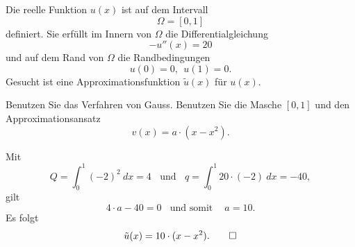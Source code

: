 Die reelle Funktion $u(x)$ ist auf dem Intervall $$\Omega = [0, 1]$$
definiert. Sie erfüllt im Innern von $\Omega$ die Differentialgleichung
\[
- u''(x) = 20
\]
und auf dem Rand von $\Omega$ die Randbedingungen 
\[
u(0) = 0, \ \ u(1) = 0.
\]
Gesucht ist eine Approximationsfunktion $\tilde u(x)$ für $u(x)$.

Benutzen Sie das Verfahren von Gauss. Benutzen Sie die Masche $[0,1]$
und den Approximationsansatz
\[
v(x) = a \cdot (x - x^2).
\]

\begin{loesung}
Mit
\[
Q = \int_0^1 (-2)^2 \ dx = 4 \ \ \ \ \text{und}  \ \ \ \ q = \int_0^1 20 \cdot (-2) \  dx = -40,
\]
gilt  
\[
4 \cdot a - 40 = 0  \ \ \ \ \text{und somit }  \ \ \ \ a = 10.
\]
Es folgt 
\[
\tilde u(x) = 10 \cdot (x - x^2).
\qedhere
\]
\end{loesung}
